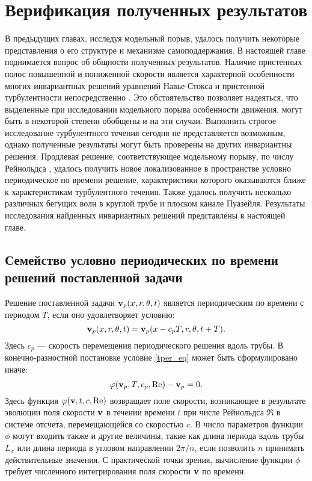 
\chapter{Верификация полученных результатов}


В предыдущих главах, исследуя модельный порыв, удалось получить некоторые представления о его структуре и механизме самоподдержания. В настоящей главе поднимается вопрос об общности полученных результатов. Наличие пристенных полос повышенной и пониженной скорости является характерной особенности многих инвариантных решений уравнений Навье-Стокса \cite{Kawahara2012} и пристенной турбулентности непосредственно \cite{Kline1967, Smith1983, Schoppa2002}. Это обстоятельство позволяет надеяться, что выделенные при исследовании модельного порыва особенности движения, могут быть в некоторой степени обобщены и на эти случаи. Выполнить строгое исследование турбулентного течения сегодня не представляется возможным, однако полученные результаты могут быть проверены на других инвариантны решения. Продлевая решение, соответствующее модельному порыву, по числу Рейнольдса \cite{Sanchez2004, Viswanath2007, Dijkstra2014}, удалось получить новое локализованное в пространстве условно периодическое по времени решение, характеристики которого оказываются ближе к характеристикам турбулентного течения. Также удалось получить несколько различных бегущих волн в круглой трубе и плоском канале Пуазейля. Результаты исследования найденных инвариантных решений представлены в настоящей главе. 


\section{Семейство условно периодических по времени решений поставленной задачи}

Решение поставленной задачи $\mathbf{v}_p(x,r,\theta,t)$ является периодическим по времени с периодом $T$, если оно удовлетворяет условию:
\begin{equation} \label{tper_eq}
\mathbf{v}_p(x,r,\theta,t) = \mathbf{v}_p(x - c_p T, r, \theta, t + T).
\end{equation}
Здесь $c_p$ --- скорость перемещения периодического решения вдоль трубы. В конечно-разностной постановке условие \eqref{tper_eq} может быть сформулировано иначе:
\begin{equation}\label{P_eq}
\varphi(\mathbf{v}_p, T, c_p, \operatorname{Re}) - \mathbf{v}_p = 0.
\end{equation}
Здесь функция $\varphi(\mathbf{v}, t, c, \operatorname{Re})$ возвращает поле скорости, возникающее в результате эволюции поля скорости $\mathbf{v}$ в течении времени $t$ при числе Рейнольдса $\Re$ в системе отсчета, перемещающейся со скоростью $c$. В число параметров функции $\phi$ могут входить также и другие величины, такие как длина периода вдоль трубы $L_x$ или длина периода в угловом направлении $2\pi/n$, если позволить $n$ принимать действительные значения. С практической точки зрения, вычисление функции $\phi$ требует численного интегрирования поля скорости $\mathbf{v}$ по времени. 

